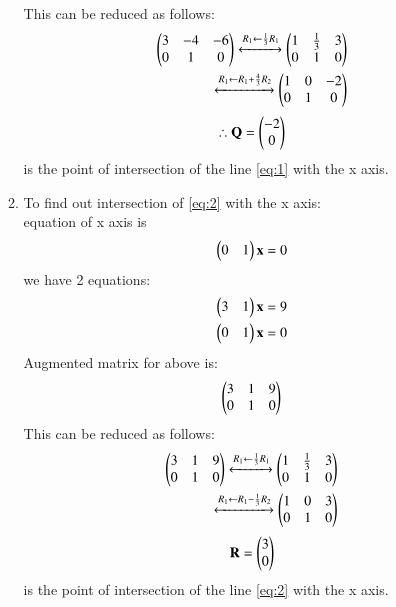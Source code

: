 \documentclass[journal,12pt,twocolumn]{IEEEtran}
\renewcommand\thesection{\arabic{section}}
\begin{document}
\begin{enumerate}[label=\thesection.\arabic*.,ref=\thesection.\theenumi]
\begin{enumerate}
\begin{align}
\end{align}
This can be reduced as follows:\\
\begin{align}
    \begin{pmatrix}3 & -4 & -6\\
           0 & 1 & 0\end{pmatrix}
    \xleftrightarrow {R_1 \leftarrow \frac{1}{3}R_1}
    \begin{pmatrix}1 & \frac{1}{3} & 3\\
          0 & 1 & 0\end{pmatrix}\\
          \xleftrightarrow{R_1 \leftarrow R_1 + \frac{4}{3}R_2}
    \begin{pmatrix}1 &0&-2\\
        0&1&0\end{pmatrix}\\
\end{align}
\begin{align}
\therefore \mathbf{Q}=\begin{pmatrix}-2\\0\end{pmatrix}
\end{align}
is the point of intersection of the line \eqref{eq:1} with the x axis.
\item To find out intersection of \eqref{eq:2} with the x axis:\\
    equation of x axis is 
        \begin{align}
        \begin{pmatrix}0&1\end{pmatrix}\mathbf{x}=0
    \end{align}
    we have 2 equations: \begin{align}
        \begin{pmatrix}3&1\end{pmatrix}\mathbf{x}=9\\
        \begin{pmatrix}0&1\end{pmatrix}\mathbf{x}=0
    \end{align}
    Augmented matrix for above is:
\begin{align}
    \begin{pmatrix}3 & 1 & 9\\
           0 & 1 & 0\end{pmatrix}
\end{align}
This can be reduced as follows:\\
\begin{align}
    \begin{pmatrix}3 & 1 & 9\\
           0 & 1 & 0\end{pmatrix}
    \xleftrightarrow {R_1 \leftarrow \frac{1}{3}R_1}
    \begin{pmatrix}1 & \frac{1}{3} & 3\\
          0 & 1 & 0\end{pmatrix}\\
          \xleftrightarrow{R_1 \leftarrow R_1 - \frac{1}{3}R_2}
    \begin{pmatrix}1 &0&3\\
        0&1&0\end{pmatrix}\\
\end{align}
\begin{align}
    \mathbf{R}=\begin{pmatrix}3\\0\end{pmatrix}
\end{align}
is the point of intersection of the line \eqref{eq:2} with the x axis.
\\

\end{enumerate}
\end{enumerate}
\end{document}
